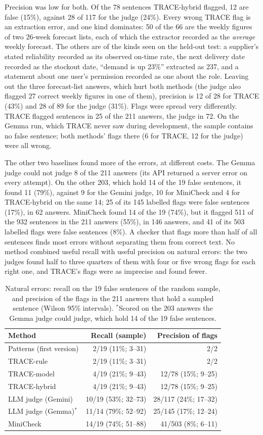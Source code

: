\documentclass[journal]{IEEEtran}
\newcommand{\NATURALBASELINES}{LLM judge (Gemma)$^{*}$ & 11/14 (79\%; 52--92) & 25/145 (17\%; 12--24) \\
MiniCheck & 14/19 (74\%; 51--88) & 41/503 (8\%; 6--11) \\}
\begin{document}
Precision was low for both. Of the 78 sentences TRACE-hybrid flagged, 12 are false (15\%), against 28 of
117 for the judge (24\%). Every wrong TRACE flag is an extraction error, and one kind dominates: 50 of the 66
are the weekly figures of two 26-week forecast lists, each of which the extractor recorded as the
\emph{average} weekly forecast. The others are of the kinds seen on the held-out test: a supplier's stated
reliability recorded as its observed on-time rate, the next delivery date recorded as the stockout date,
``demand is up 23\%'' extracted as 237, and a statement about one user's permission recorded as one about
the role. Leaving out the three forecast-list answers, which hurt both methods (the judge also flagged 27
correct weekly figures in one of them), precision is 12 of 28 for TRACE (43\%) and 28 of 89 for the judge
(31\%). Flags were spread very differently. TRACE flagged sentences in 25 of the 211 answers, the judge in
72. On the Gemma run, which TRACE never saw during development, the sample contains no false sentence; both
methods' flags there (6 for TRACE, 12 for the judge) were all wrong.

The other two baselines found more of the errors, at different costs. The Gemma judge could not judge 8 of
the 211 answers (its API returned a server error on every attempt). On the other 203, which hold 14 of the
19 false sentences, it found 11 (79\%), against 9 for the Gemini judge, 10 for MiniCheck and 4 for
TRACE-hybrid on the same 14; 25 of its 145 labelled flags were false sentences (17\%), in 62 answers.
MiniCheck found 14 of the 19 (74\%), but it flagged 511 of the 932 sentences in the 211 answers (55\%), in
146 answers, and 41 of its 503 labelled flags were false sentences (8\%). A checker that flags more than
half of all sentences finds most errors without separating them from correct text. No method combined
useful recall with useful precision on natural errors: the two judges found half to three quarters of them
with four or five wrong flags for each right one, and TRACE's flags were as imprecise and found fewer.

\begin{table}[t]
\centering\footnotesize
\setlength{\tabcolsep}{4pt}
\caption{Natural errors: recall on the 19 false sentences of the random sample, and precision of the
flags in the 211 answers that hold a sampled sentence (Wilson 95\% intervals). $^{*}$Scored on the 203
answers the Gemma judge could judge, which hold 14 of the 19 false sentences.}
\label{tab:naturalmethods}
\begin{tabular}{@{}lrr@{}}
\toprule
Method & Recall (sample) & Precision of flags \\
\midrule
Patterns (first version) & 2/19 (11\%; 3--31) & 2/2 \\
TRACE-rule & 2/19 (11\%; 3--31) & 2/2 \\
TRACE-model & 4/19 (21\%; 9--43) & 12/78 (15\%; 9--25) \\
TRACE-hybrid & 4/19 (21\%; 9--43) & 12/78 (15\%; 9--25) \\
LLM judge (Gemini) & 10/19 (53\%; 32--73) & 28/117 (24\%; 17--32) \\
\NATURALBASELINES
\bottomrule
\end{tabular}
\end{table}
\end{document}
